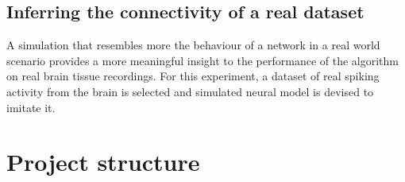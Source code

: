 \subsection{Inferring the connectivity of a real dataset}

A simulation that resembles more the behaviour of a network in a real world scenario provides a more meaningful insight to the performance of the algorithm on real brain tissue recordings. For this experiment, a dataset of real spiking activity from the brain is selected and simulated neural model is devised to imitate it. 

\section{Project structure}
